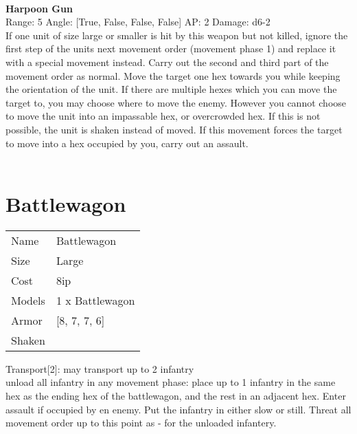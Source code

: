 \ \\
{\bf Harpoon Gun } \\



Range: 5  Angle: [True, False, False, False] AP: 2 Damage: d6-2 \\
If one unit of size large or smaller is hit by this weapon but not killed, ignore the first step of the units next movement order (movement phase 1) and replace it with a special movement instead. Carry out the second and third part of the movement order as normal. Move the target one hex towards you while keeping the orientation of the unit. If there are multiple hexes which you can move the target to, you may choose where to move the enemy. However you cannot choose to move the unit into an impassable hex, or overcrowded hex. If this is not possible, the unit is shaken instead of moved. If this movement forces the target to move into a hex occupied by you, carry out an assault.\\ 




 
\ \\













\clearpage

\section{ Battlewagon }

\begin{tabular}{ll}
  Name & Battlewagon \\
  Size & Large\\
  Cost & 8ip\\
  Models & 1 x Battlewagon\\
  Armor & [8, 7, 7, 6]\\
  Shaken & \\
\end{tabular}

\noindent Transport[2]: may transport up to 2 infantry\\ 
unload all infantry in any movement phase: place up to 1 infantry in the same hex as the ending hex of the battlewagon, and the rest in an adjacent hex. Enter assault if occupied by en enemy. Put the infantry in either slow or still. Threat all movement order up to this point as - for the unloaded infantery.\\ 


